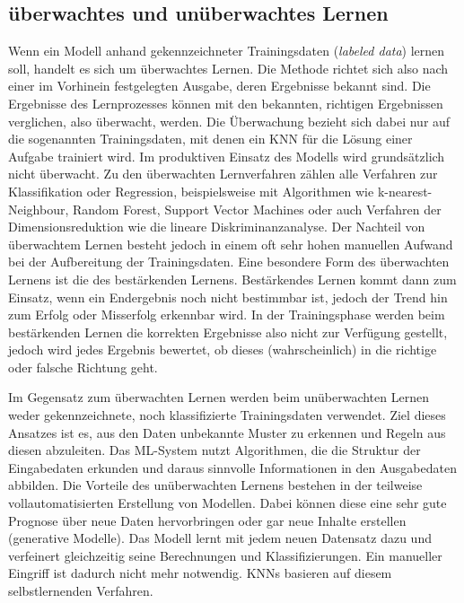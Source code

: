 \subsection{überwachtes und unüberwachtes Lernen}\label{überwachtes / unüberwachtes Lernen}
Wenn ein Modell anhand gekennzeichneter Trainingsdaten (\emph{labeled data}) lernen soll, handelt es sich um überwachtes Lernen. Die Methode richtet sich also nach einer im Vorhinein festgelegten Ausgabe, deren Ergebnisse bekannt sind. Die Ergebnisse des Lernprozesses können mit den bekannten, richtigen Ergebnissen verglichen, also überwacht, werden. Die Überwachung bezieht sich dabei nur auf die sogenannten Trainingsdaten, mit denen ein KNN für die Lösung einer Aufgabe trainiert wird. Im produktiven Einsatz des Modells wird grundsätzlich nicht überwacht.
Zu den überwachten Lernverfahren zählen alle Verfahren zur Klassifikation oder Regression, beispielsweise mit Algorithmen wie k-nearest-Neighbour, Random Forest, Support Vector Machines oder auch Verfahren der Dimensionsreduktion wie die lineare Diskriminanzanalyse. Der Nachteil von überwachtem Lernen besteht jedoch in einem oft sehr hohen manuellen Aufwand bei der Aufbereitung der Trainingsdaten.
Eine besondere Form des überwachten Lernens ist die des bestärkenden Lernens. Bestärkendes Lernen kommt dann zum Einsatz, wenn ein Endergebnis noch nicht bestimmbar ist, jedoch der Trend hin zum Erfolg oder Misserfolg erkennbar wird. In der Trainingsphase werden beim bestärkenden Lernen die korrekten Ergebnisse also nicht zur Verfügung gestellt, jedoch wird jedes Ergebnis bewertet, ob dieses (wahrscheinlich) in die richtige oder falsche Richtung geht.\cite{ras18}

Im Gegensatz zum überwachten Lernen werden beim unüberwachten Lernen weder gekennzeichnete, noch klassifizierte Trainingsdaten verwendet. Ziel dieses Ansatzes ist es, aus den Daten unbekannte Muster zu erkennen und Regeln aus diesen abzuleiten. Das ML-System nutzt Algorithmen, die die Struktur der Eingabedaten erkunden und daraus sinnvolle Informationen in den Ausgabedaten abbilden. Die Vorteile des unüberwachten Lernens bestehen in der teilweise vollautomatisierten Erstellung von Modellen. Dabei können diese eine sehr gute Prognose über neue Daten hervorbringen oder gar neue Inhalte erstellen (generative Modelle). Das Modell lernt mit jedem neuen Datensatz dazu und verfeinert gleichzeitig seine Berechnungen und Klassifizierungen. Ein manueller Eingriff ist dadurch nicht mehr notwendig. KNNs basieren auf diesem selbstlernenden Verfahren.

